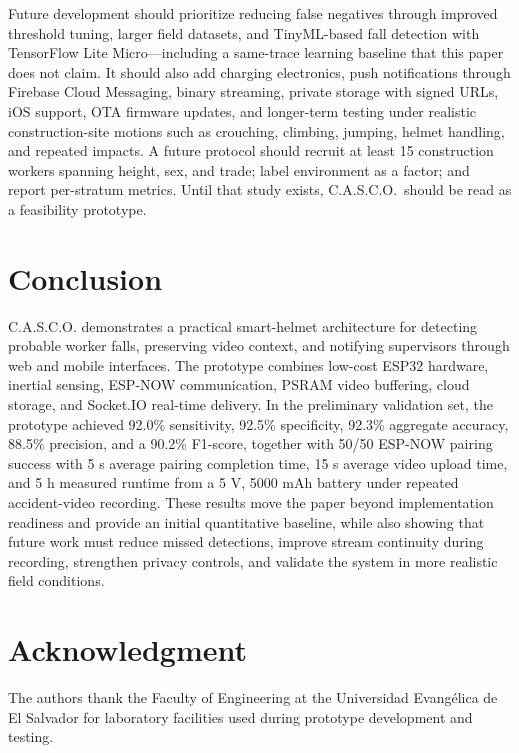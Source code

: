 \documentclass[conference]{IEEEtran}
\begin{document}
Future development should prioritize reducing false negatives through improved threshold tuning, larger field datasets, and TinyML-based fall detection with TensorFlow Lite Micro---including a same-trace learning baseline that this paper does not claim. It should also add charging electronics, push notifications through Firebase Cloud Messaging, binary streaming, private storage with signed URLs, iOS support, OTA firmware updates, and longer-term testing under realistic construction-site motions such as crouching, climbing, jumping, helmet handling, and repeated impacts. A future protocol should recruit at least 15 construction workers spanning height, sex, and trade; label environment as a factor; and report per-stratum metrics. Until that study exists, C.A.S.C.O.\ should be read as a feasibility prototype.

\section{Conclusion}
C.A.S.C.O. demonstrates a practical smart-helmet architecture for detecting probable worker falls, preserving video context, and notifying supervisors through web and mobile interfaces. The prototype combines low-cost ESP32 hardware, inertial sensing, ESP-NOW communication, PSRAM video buffering, cloud storage, and Socket.IO real-time delivery. In the preliminary validation set, the prototype achieved 92.0\% sensitivity, 92.5\% specificity, 92.3\% aggregate accuracy, 88.5\% precision, and a 90.2\% F1-score, together with 50/50 ESP-NOW pairing success with 5 s average pairing completion time, 15 s average video upload time, and 5 h measured runtime from a 5 V, 5000 mAh battery under repeated accident-video recording. These results move the paper beyond implementation readiness and provide an initial quantitative baseline, while also showing that future work must reduce missed detections, improve stream continuity during recording, strengthen privacy controls, and validate the system in more realistic field conditions.

\section*{Acknowledgment}
The authors thank the Faculty of Engineering at the Universidad Evangélica de El Salvador for laboratory facilities used during prototype development and testing.
\end{document}
